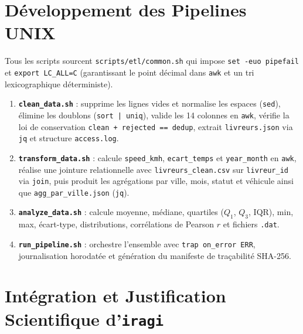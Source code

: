 \documentclass[11pt,a4paper]{article}
\begin{document}
\section{D\'eveloppement des Pipelines UNIX}
Tous les scripts sourcent \texttt{scripts/etl/common.sh} qui impose \texttt{set -euo pipefail} et \texttt{export LC\_ALL=C} (garantissant le point d\'ecimal dans \texttt{awk} et un tri lexicographique d\'eterministe).
\begin{enumerate}
    \item \textbf{\texttt{clean\_data.sh}} : supprime les lignes vides et normalise les espaces (\texttt{sed}), \'elimine les doublons (\texttt{sort | uniq}), valide les 14 colonnes en \texttt{awk}, v\'erifie la loi de conservation \texttt{clean + rejected == dedup}, extrait \texttt{livreurs.json} via \texttt{jq} et structure \texttt{access.log}.
    \item \textbf{\texttt{transform\_data.sh}} : calcule \texttt{speed\_kmh}, \texttt{ecart\_temps} et \texttt{year\_month} en \texttt{awk}, r\'ealise une jointure relationnelle avec \texttt{livreurs\_clean.csv} sur \texttt{livreur\_id} via \texttt{join}, puis produit les agr\'egations par ville, mois, statut et v\'ehicule ainsi que \texttt{agg\_par\_ville.json} (\texttt{jq}).
    \item \textbf{\texttt{analyze\_data.sh}} : calcule moyenne, m\'ediane, quartiles ($Q_1$, $Q_3$, $\text{IQR}$), min, max, \'ecart-type, distributions, corr\'elations de Pearson $r$ et fichiers \texttt{.dat}.
    \item \textbf{\texttt{run\_pipeline.sh}} : orchestre l'ensemble avec \texttt{trap on\_error ERR}, journalisation horodat\'ee et g\'en\'eration du manifeste de tra\c{c}abilit\'e SHA-256.
\end{enumerate}

\section{Int\'egration et Justification Scientifique d'\texttt{iragi}}
\end{document}
